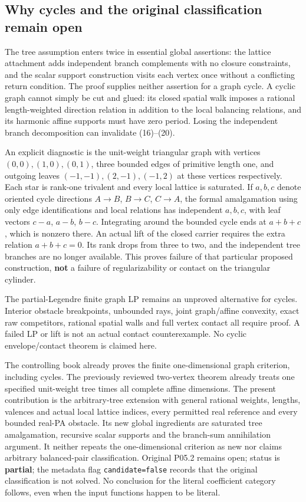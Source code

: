 \documentclass[
  11pt,
]{article}
\begin{document}
\subsection{Why cycles and the original classification remain
open}\label{why-cycles-and-the-original-classification-remain-open}

The tree assumption enters twice in essential global assertions: the
lattice attachment adds independent branch complements with no closure
constraints, and the scalar support construction visits each vertex once
without a conflicting return condition. The proof supplies neither
assertion for a graph cycle. A cyclic graph cannot simply be cut and
glued: its closed spatial walk imposes a rational length-weighted
direction relation in addition to the local balancing relations, and its
harmonic affine supports must have zero period. Losing the independent
branch decomposition can invalidate (16)--(20).

An explicit diagnostic is the unit-weight triangular graph with vertices
\((0,0),(1,0),(0,1)\), three bounded edges of primitive length one, and
outgoing leaves \((-1,-1),(2,-1),(-1,2)\) at these vertices
respectively. Each star is rank-one trivalent and every local lattice is
saturated. If \(a,b,c\) denote oriented cycle directions \(A\to B\),
\(B\to C\), \(C\to A\), the formal amalgamation using only edge
identifications and local relations has independent \(a,b,c\), with leaf
vectors \(c-a\), \(a-b\), \(b-c\). Integrating around the bounded cycle
ends at \(a+b+c\), which is nonzero there. An actual lift of the closed
carrier requires the extra relation \(a+b+c=0\). Its rank drops from
three to two, and the independent tree branches are no longer available.
This proves failure of that particular proposed construction,
\textbf{not} a failure of regularizability or contact on the triangular
cylinder.

The partial-Legendre finite graph LP remains an unproved alternative for
cycles. Interior obstacle breakpoints, unbounded rays, joint
graph/affine convexity, exact raw competitors, rational spatial walls
and full vertex contact all require proof. A failed LP or lift is not an
actual contact counterexample. No cyclic envelope/contact theorem is
claimed here.

The controlling book already proves the finite one-dimensional graph
criterion, including cycles. The previously reviewed two-vertex theorem
already treats one specified unit-weight tree times all complete affine
dimensions. The present contribution is the arbitrary-tree extension
with general rational weights, lengths, valences and actual local
lattice indices, every permitted real reference and every bounded
real-PA obstacle. Its new global ingredients are saturated tree
amalgamation, recursive scalar supports and the branch-sum annihilation
argument. It neither repeats the one-dimensional criterion as new nor
claims arbitrary balanced-pair classification. Original P05.2 remains
open; status is \textbf{partial}; the metadata flag \texttt{candidate=false}
records that the original classification is not solved. No
conclusion for the literal coefficient category follows, even when the
input functions happen to be literal.
\end{document}
